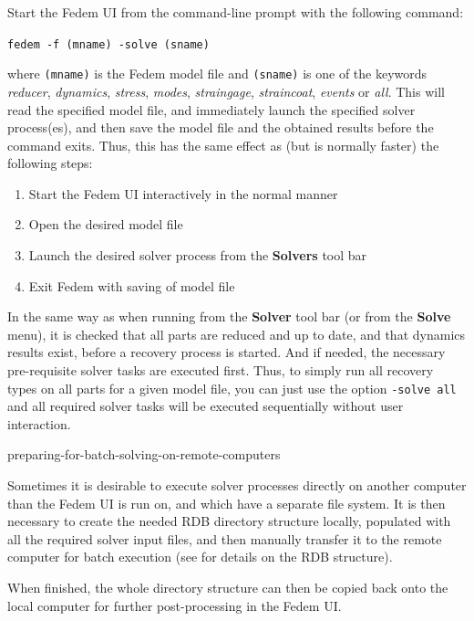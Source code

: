 {Start the Fedem UI from the command-line prompt with the following command:

\texttt{fedem -f (mname) -solve (sname)}

\noindent
where {\tt(mname)} is the Fedem model file and {\tt(sname)} is one of the
keywords {\sl reducer}, {\sl dynamics}, {\sl stress}, {\sl modes},
{\sl straingage}, {\sl straincoat}, {\sl events} or {\sl all}.
This will read the specified model file, and immediately launch the specified
solver process(es), and then save the model file and the obtained results before
the command exits.
Thus, this has the same effect as (but is normally faster) the following steps:

\begin{enumerate}
\item Start the Fedem UI interactively in the normal manner
\item Open the desired model file
\item Launch the desired solver process from the \textbf{Solvers} tool bar
\item Exit Fedem with saving of model file
\end{enumerate}

In the same way as when running from the \textbf{Solver} tool bar (or from the
\textbf{Solve} menu), it is checked that all parts are reduced and up to date,
and that dynamics results exist, before a recovery process is started.
And if needed, the necessary pre-requisite solver tasks are executed first.
Thus, to simply run all recovery types on all parts for a given model file,
you can just use the option {\tt -solve all} and all required solver tasks
will be executed sequentially without user interaction.


           {preparing-for-batch-solving-on-remote-computers}

Sometimes it is desirable to execute solver processes directly on
another computer than the Fedem UI is run on, and which have a separate
file system. It is then necessary to create the needed RDB directory
structure locally, populated with all the required solver input files,
and then manually transfer it to the remote computer for batch execution
(see 
for details on the RDB structure).

When finished, the whole directory structure can then be copied back
onto the local computer for further post-processing in the Fedem UI.

}
